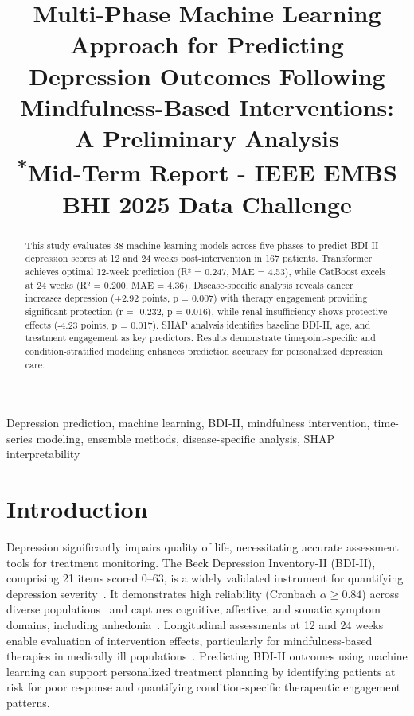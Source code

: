 \documentclass[conference]{IEEEtran}
\begin{document}
\title{Multi-Phase Machine Learning Approach for Predicting Depression Outcomes Following Mindfulness-Based Interventions: A Preliminary Analysis\\
{\footnotesize \textsuperscript{*}Mid-Term Report - IEEE EMBS BHI 2025 Data Challenge}}

\author{
}

\maketitle

\begin{abstract}
This study evaluates 38 machine learning models across five phases to predict BDI-II depression scores at 12 and 24 weeks post-intervention in 167 patients. Transformer achieves optimal 12-week prediction (R² = 0.247, MAE = 4.53), while CatBoost excels at 24 weeks (R² = 0.200, MAE = 4.36). Disease-specific analysis reveals cancer increases depression (+2.92 points, p = 0.007) with therapy engagement providing significant protection (r = -0.232, p = 0.016), while renal insufficiency shows protective effects (-4.23 points, p = 0.017). SHAP analysis identifies baseline BDI-II, age, and treatment engagement as key predictors. Results demonstrate timepoint-specific and condition-stratified modeling enhances prediction accuracy for personalized depression care.
\end{abstract}

\begin{IEEEkeywords}
Depression prediction, machine learning, BDI-II, mindfulness intervention, time-series modeling, ensemble methods, disease-specific analysis, SHAP interpretability
\end{IEEEkeywords}

\section{Introduction}
Depression significantly impairs quality of life, necessitating accurate assessment tools for treatment monitoring. The Beck Depression Inventory-II (BDI-II), comprising 21 items scored 0–63, is a widely validated instrument for quantifying depression severity~\cite{beck1996manual}. It demonstrates high reliability (Cronbach $\alpha \geq 0.84$) across diverse populations~\cite{beck1996manual, wang2013psychometric} and captures cognitive, affective, and somatic symptom domains, including anhedonia~\cite{pizzagalli2005reduced, treadway2009worth}. Longitudinal assessments at 12 and 24 weeks enable evaluation of intervention effects, particularly for mindfulness-based therapies in medically ill populations~\cite{hunot2013mindfulness}. Predicting BDI-II outcomes using machine learning can support personalized treatment planning by identifying patients at risk for poor response and quantifying condition-specific therapeutic engagement patterns.
\end{document}
